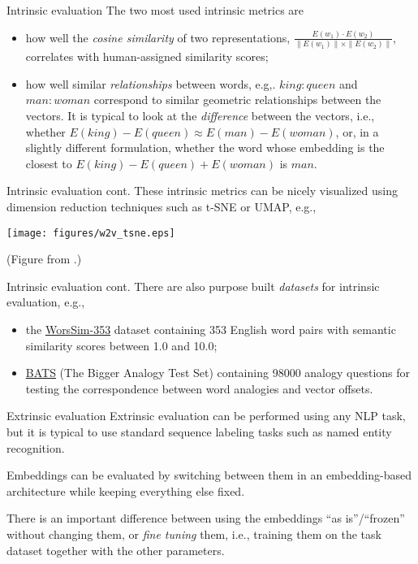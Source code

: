 \documentclass[style=upen, size=14pt]{powerdot}
\newcommand{\gold}{\color{arany}}
\theoremstyle{definition}
\begin{document}
\begin{slide}[toc=Intrinsic]{Intrinsic evaluation}
  The two most used intrinsic metrics are
  \begin{itemize}
  \item how well the \emph{\gold cosine similarity} of two representations,
    $\frac{E(w_1)\cdot E(w_2)}{\|E(w_1)\|\times \|E(w_2)\|} $, correlates with
    human-assigned similarity scores;
  \item how well similar \emph{\gold relationships} between words, e.g,.
    $king:queen$ and $man:woman$ correspond to similar geometric relationships
    between the vectors. It is typical to look at the \emph{difference} between
    the vectors, i.e., whether $E(king)-E(queen)\approx E(man)-E(woman)$, or, in
    a slightly different formulation, whether the word whose embedding is the
    closest to $E(king)-E(queen) + E(woman)$ is $man$.
  \end{itemize}
\end{slide}

\begin{slide}[toc=]{Intrinsic evaluation cont.}
  These intrinsic metrics can be nicely visualized using dimension reduction
  techniques such as t-SNE or UMAP, e.g., 
  \begin{center}
    \texttt{[image: figures/w2v\_tsne.eps]}
    
    (\footnotesize Figure from \citet[ch. 6]{jurafsky2019speech}.)
  \end{center}  
\end{slide}

\begin{slide}[toc=]{Intrinsic evaluation cont.}
  There are also purpose built \emph{datasets} for intrinsic evaluation, e.g.,
  \begin{itemize}
  \item the
    \href{http://alfonseca.org/eng/research/wordsim353.html}{WorsSim-353}
    dataset containing 353 English word pairs with semantic similarity scores
    between 1.0 and 10.0;
  \item \href{https://vecto.space/projects/BATS/}{BATS} (The Bigger Analogy Test
    Set) containing 98000 analogy questions for testing the correspondence
    between word analogies and vector offsets.
  \end{itemize}
\end{slide}

\begin{slide}[toc=Extrinsic]{Extrinsic evaluation}
  Extrinsic evaluation can be performed using any NLP task, but it is typical to
  use standard sequence labeling tasks such as named entity recognition.

  Embeddings can be evaluated by switching between them in an embedding-based
  architecture while keeping everything else fixed.\bigskip

  There is an important difference between using the embeddings ``as is''/``frozen''
  without changing them, or \emph{\gold fine tuning} them, i.e., training them
  on the task dataset together with the other parameters.
\end{slide}
\end{document}
